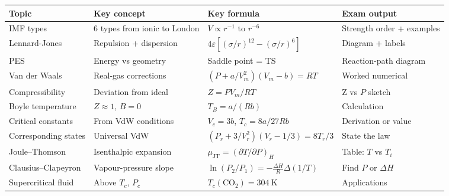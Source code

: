 \documentclass[12pt,a4paper]{article}
\begin{document}
\begin{tcolorbox}[tikzbox, title={Summary Reference Table --- Module 3}]
\begin{tabularx}{\linewidth}{|B{2.8cm}|Y|Y|Y|}
\hline
\textbf{Topic} & \textbf{Key concept} & \textbf{Key formula} & \textbf{Exam output} \\
\hline
IMF types & 6 types from ionic to London & $V \propto r^{-1}$ to $r^{-6}$ & Strength order + examples \\
\hline
Lennard-Jones & Repulsion + dispersion & $4\varepsilon[(\sigma/r)^{12}-(\sigma/r)^6]$ & Diagram + labels \\
\hline
PES & Energy vs geometry & Saddle point = TS & Reaction-path diagram \\
\hline
Van der Waals & Real-gas corrections & $(P+a/V_m^2)(V_m-b)=RT$ & Worked numerical \\
\hline
Compressibility & Deviation from ideal & $Z=PV_m/RT$ & Z vs $P$ sketch \\
\hline
Boyle temperature & $Z\approx1$, $B=0$ & $T_B=a/(Rb)$ & Calculation \\
\hline
Critical constants & From VdW conditions & $V_c=3b$, $T_c=8a/27Rb$ & Derivation or value \\
\hline
Corresponding states & Universal VdW & $(P_r+3/V_r^2)(V_r-1/3)=8T_r/3$ & State the law \\
\hline
Joule--Thomson & Isenthalpic expansion & $\mu_{\mathrm{JT}}=(\partial T/\partial P)_H$ & Table: $T$ vs $T_i$ \\
\hline
Clausius--Clapeyron & Vapour-pressure slope & $\ln(P_2/P_1)=-\frac{\Delta H}{R}\Delta(1/T)$ & Find $P$ or $\Delta H$ \\
\hline
Supercritical fluid & Above $T_c$, $P_c$ & $T_c(\mathrm{CO_2})=304\ \mathrm{K}$ & Applications \\
\hline
\end{tabularx}
\end{tcolorbox}
\end{document}
